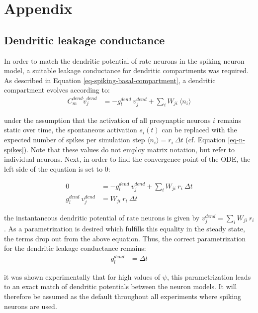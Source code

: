 
\chapter{Appendix}

\section{Dendritic leakage conductance}\label{sec-gl-dend}

In order to match the dendritic potential of rate neurons  in the spiking neuron model, a suitable leakage conductance
for dendritic compartments was required. As described in Equation \ref{eq-spiking-basal-compartment}, a dendritic
compartment evolves according to:
\begin{align}
  C_m^{dend} \dot{v}_j^{dend} & = -g_l^{dend} \  v_j^{dend} + \sum_i W_{ji} \    \langle \textit{n}_i \rangle
\end{align}

under the assumption that the activation of all presynaptic neurons $i$ remains static over time, the spontaneous
activation $s_i(t)$ can be replaced with the expected number of spikes per simulation step $\langle \textit{n}_i \rangle
= r_i \ \Delta t$ (cf. Equation \ref{eq-n-spikes}). Note that these values do not employ matrix notation, but refer to
individual neurons. Next, in order to find the convergence point of the ODE, the left side of the equation is set to $0$:


\begin{align}
  0                        & = -g_l^{dend} \  v_j^{dend} + \sum_i W_{ji} \    r_i \ \Delta t \\
  g_l^{dend} \  v_j^{dend} & = W_{ji} \    r_i \ \Delta t
\end{align}

the instantaneous dendritic potential of rate neurons is given by $v_j^{dend} = \sum_i W_{ji} \ r_i$. As a
parametrization is desired which fulfills this equality in the steady state, the terms drop out from the above equation.
Thus, the correct parametrization for the dendritic leakage conductance remains:
\begin{align}
  g_l^{dend} & = \Delta t
\end{align}

it was shown experimentally that for high values of $\psi$, this parametrization leads to an exact match of dendritic
potentials between the neuron models. It will therefore be assumed as the default throughout all experiments where
spiking neurons are used.

